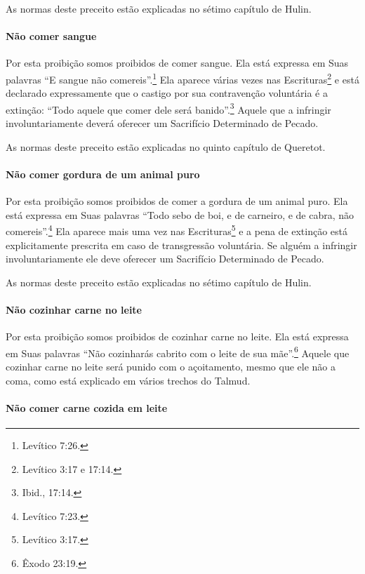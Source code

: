 As normas deste preceito estão explicadas no sétimo capítulo de Hulin.

\paragraph{Não comer sangue}

Por esta proibição somos proibidos de comer sangue. Ela está expressa
em Suas palavras ``E sangue não comereis''.\footnote{Levítico 7:26.} Ela aparece
várias vezes nas Escrituras\footnote{Levítico 3:17 e 17:14.} e está declarado
expressamente que o castigo por sua contravenção voluntária é a
extinção: ``Todo aquele que comer dele será banido''.\footnote{Ibid., 17:14.}
Aquele que a infringir involuntariamente deverá oferecer um Sacrifício
Determinado de Pecado.

As normas deste preceito estão explicadas no quinto capítulo de Queretot.

\paragraph{Não comer gordura de um animal puro}

Por esta proibição somos proibidos de comer a gordura de um animal
puro. Ela está expressa em Suas palavras ``Todo sebo de boi, e de
carneiro, e de cabra, não comereis''.\footnote{Levítico 7:23.} Ela aparece mais
uma vez nas Escrituras\footnote{Levítico 3:17.} e a pena de extinção está
explicitamente prescrita em caso de transgressão voluntária. Se alguém a
infringir involuntariamente ele deve oferecer um Sacrifício Determinado
de Pecado.

As normas deste preceito estão explicadas no sétimo capítulo de Hulin.

\paragraph{Não cozinhar carne no leite}

Por esta proibição somos proibidos de cozinhar carne no leite. Ela está
expressa em Suas palavras ``Não cozinharás cabrito com o leite de sua
mãe''.\footnote{Êxodo 23:19.} Aquele que cozinhar carne no leite será punido com o
açoitamento, mesmo que ele não a coma, como está explicado em vários
trechos do Talmud.

\paragraph{Não comer carne cozida em leite}

